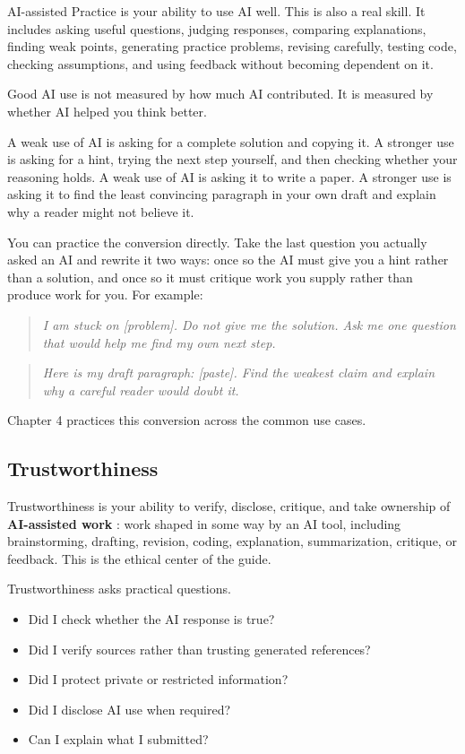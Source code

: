 \documentclass{SIAMbook2023}
\newcommand{\keyterm}[2][\relax]{%
  \textbf{#2}%
  \ifx\relax#1\index{#2|textbf}\else\index{#1|textbf}\fi}
\newcommand{\studentprompt}[1]{\begin{quote}\small\itshape #1\end{quote}}
\begin{document}
AI-assisted Practice is your ability to use AI well. This is also a real skill. It includes asking useful questions, judging responses, comparing explanations, finding weak points, generating practice problems, revising carefully, testing code, checking assumptions, and using feedback without becoming dependent on it.

Good AI use is not measured by how much AI contributed. It is measured by whether AI helped you think better.

A weak use of AI is asking for a complete solution and copying it. A stronger use is asking for a hint, trying the next step yourself, and then checking whether your reasoning holds. A weak use of AI is asking it to write a paper. A stronger use is asking it to find the least convincing paragraph in your own draft and explain why a reader might not believe it.

You can practice the conversion directly. Take the last question you actually asked an AI and rewrite it two ways: once so the AI must give you a hint rather than a solution, and once so it must critique work you supply rather than produce work for you. For example:

\studentprompt{I am stuck on [problem]. Do not give me the solution. Ask me one question that would help me find my own next step.}

\studentprompt{Here is my draft paragraph: [paste]. Find the weakest claim and explain why a careful reader would doubt it.}

Chapter 4 practices this conversion across the common use cases.

\subsection{Trustworthiness}
\label{subsec:responsible-judgment}

Trustworthiness is your ability to verify, disclose, critique, and take ownership of \keyterm{AI-assisted work}: work shaped in some way by an AI tool, including brainstorming, drafting, revision, coding, explanation, summarization, critique, or feedback. This is the ethical center of the guide.

Trustworthiness asks practical questions.

\begin{itemize}
\item Did I check whether the AI response is true?
\item Did I verify sources rather than trusting generated references?
\item Did I protect private or restricted information?
\item Did I disclose AI use when required?
\item Can I explain what I submitted?
\end{itemize}
\end{document}
